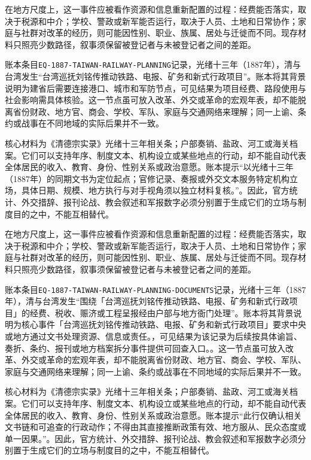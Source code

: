 在地方尺度上，这一事件应被看作资源和信息重新配置的过程：经费能否落实，取决于税源和中介；学校、警政或新军能否运行，取决于人员、土地和日常协作；家庭与社群对改革的经历，则可能因性别、职业、族属、居处与迁徙而不同。现存材料只照亮少数路径，叙事须保留被登记者与未被登记者之间的差距。

账本条目\texttt{EQ-1887-TAIWAN-RAILWAY-PLANNING}记录，光绪十三年（1887年），清与台湾发生“台湾巡抚刘铭传推动铁路、电报、矿务和新式行政项目”。账本将其背景说明为建省后需要连接港口、城市和军防节点，可见结果为项目经费、路段使用与社会影响需具体核验。这一节点虽可放入改革、外交或革命的宏观年表，却不能脱离省份财政、地方官、商会、学校、军队、家庭与交通网络来理解；同一上谕、条约或战事在不同地域的实际后果并不一致。

核心材料为《清德宗实录》光绪十三年相关条；户部奏销、盐政、河工或海关档案。它们可以支持年序、制度文本、机构设立或某些地点的行动，却不能自动代表全体居民的收入、教育、身份、性别关系或政治意愿。账本提示“以光绪十三年（1887年）的同期文书为定位起点；官修记录、奏报或外交文本服务特定机构立场，具体日期、规模、地方执行与对手视角须以独立材料复核。”。因此，官方统计、外交措辞、报刊论战、教会叙述和军报数字必须分别置于生成它们的立场与制度目的之中，不能互相替代。

在地方尺度上，这一事件应被看作资源和信息重新配置的过程：经费能否落实，取决于税源和中介；学校、警政或新军能否运行，取决于人员、土地和日常协作；家庭与社群对改革的经历，则可能因性别、职业、族属、居处与迁徙而不同。现存材料只照亮少数路径，叙事须保留被登记者与未被登记者之间的差距。

账本条目\texttt{EQ-1887-TAIWAN-RAILWAY-PLANNING-DOCUMENTS}记录，光绪十三年（1887年），清与台湾发生“围绕「台湾巡抚刘铭传推动铁路、电报、矿务和新式行政项目」的经费、税收、赈济或工程呈报经由户部与地方衙门处理”。账本将其背景说明为核心事件「台湾巡抚刘铭传推动铁路、电报、矿务和新式行政项目」要求中央或地方通过文书处理资源、信息或责任。，可见结果为该记录为后续按具体谕旨、奏折、条约、报刊或地方档案拆分事件提供可回查入口。。这一节点虽可放入改革、外交或革命的宏观年表，却不能脱离省份财政、地方官、商会、学校、军队、家庭与交通网络来理解；同一上谕、条约或战事在不同地域的实际后果并不一致。

核心材料为《清德宗实录》光绪十三年相关条；户部奏销、盐政、河工或海关档案。它们可以支持年序、制度文本、机构设立或某些地点的行动，却不能自动代表全体居民的收入、教育、身份、性别关系或政治意愿。账本提示“此行仅确认相关文书链和可追查的行政动作；不得由其直接推断政策有效、地方服从、民众态度或单一因果。”。因此，官方统计、外交措辞、报刊论战、教会叙述和军报数字必须分别置于生成它们的立场与制度目的之中，不能互相替代。

